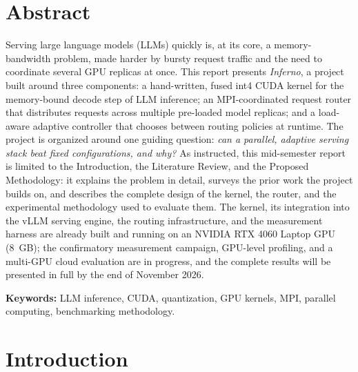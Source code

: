 \documentclass[11pt,a4paper]{article}
\begin{document}
\section*{Abstract}
Serving large language models (LLMs) quickly is, at its core, a memory-bandwidth problem, made harder by bursty
request traffic and the need to coordinate several GPU replicas at once. This report presents \textit{Inferno}, a
project built around three components: a hand-written, fused int4 CUDA kernel for the memory-bound decode step of
LLM inference; an MPI-coordinated request router that distributes requests across multiple pre-loaded model
replicas; and a load-aware adaptive controller that chooses between routing policies at runtime. The project is
organized around one guiding question: \emph{can a parallel, adaptive serving stack beat fixed configurations, and
why?} As instructed, this mid-semester report is limited to the Introduction, the Literature Review, and the
Proposed Methodology: it explains the problem in detail, surveys the prior work the project builds on, and describes
the complete design of the kernel, the router, and the experimental methodology used to evaluate them. The kernel,
its integration into the vLLM serving engine, the routing infrastructure, and the measurement harness are already
built and running on an NVIDIA RTX 4060 Laptop GPU (8~GB); the confirmatory measurement campaign, GPU-level
profiling, and a multi-GPU cloud evaluation are in progress, and the complete results will be presented in full by
the end of November 2026.

\vspace{0.25cm}
\noindent\textbf{Keywords:} LLM inference, CUDA, quantization, GPU kernels, MPI, parallel computing, benchmarking methodology.

\newpage
\tableofcontents
\newpage

\onehalfspacing

\section{Introduction}
\end{document}
